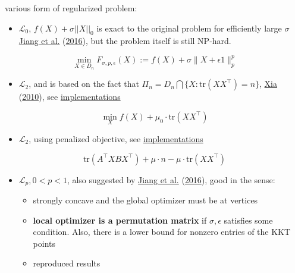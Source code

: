 \documentclass[
  10pt,
  a4paper,
,tablecaptionabove
]{scrartcl}
\providecommand{\tightlist}{%
  \setlength{\itemsep}{0pt}\setlength{\parskip}{0pt}}
\begin{document}
various form of regularized problem:

\begin{itemize}
\tightlist
\item
  \(\mathscr L_0\), \(f(X) + \sigma ||X||_0\) is exact to the original
  problem for efficiently large \(\sigma\)
  \protect\hyperlink{ref-jiang_l_p-norm_2016}{Jiang et al.}
  (\protect\hyperlink{ref-jiang_l_p-norm_2016}{2016}), but the problem
  itself is still NP-hard.
\end{itemize}

\[\min _{X \in D _{n}} F_{\sigma, p, \epsilon}(X):=f(X)+\sigma\|X+\epsilon 1 \|_{p}^{p}\]

\begin{itemize}
\tightlist
\item
  \(\mathscr L_2\), and is based on the fact that
  \(\Pi_n = D_n \bigcap \{X:\textrm{tr}(XX^\top) = n\}\),
  \protect\hyperlink{ref-xia_efficient_2010}{Xia}
  (\protect\hyperlink{ref-xia_efficient_2010}{2010}), see
  \protect\hyperlink{mathscr-l_2}{implementations}
\end{itemize}

\[\min_Xf(X)+\mu_{0} \cdot \textrm{tr} \left(X X^{\top}\right)\]

\begin{itemize}
\tightlist
\item
  \(\mathscr L_2\), using penalized objective, see
  \protect\hyperlink{mathscr-l_2--mathscr-l_1-penalized-formulation}{implementations}
\end{itemize}

\[\textrm{tr}(A^\top XB X^\top)  + \mu\cdot n - \mu\cdot \textrm{tr}(XX^\top )\]

\begin{itemize}
\tightlist
\item
  \(\mathscr L_p, 0<p< 1\), also suggested by
  \protect\hyperlink{ref-jiang_l_p-norm_2016}{Jiang et al.}
  (\protect\hyperlink{ref-jiang_l_p-norm_2016}{2016}), good in the
  sense:

  \begin{itemize}
  \tightlist
  \item
    strongly concave and the global optimizer must be at vertices
  \item
    \textbf{local optimizer is a permutation matrix} if
    \(\sigma, \epsilon\) satisfies some condition. Also, there is a
    lower bound for nonzero entries of the KKT points
  \item
    reproduced results
  \end{itemize}
\end{itemize}
\end{document}
